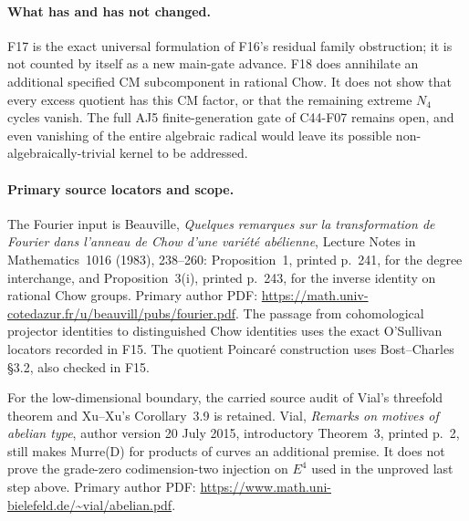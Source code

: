 \documentclass[11pt]{article}
\theoremstyle{remark}\newtheorem{remark}[theorem]{Remark}
\begin{document}
\paragraph{What has and has not changed.}
F17 is the exact universal formulation of F16's residual
family obstruction; it is not counted by itself as a new
main-gate advance.  F18 does annihilate an additional specified
CM subcomponent in rational Chow.  It does not show that
every excess quotient has this CM factor, or that the
remaining extreme $N_4$ cycles vanish.  The full AJ5
finite-generation gate of C44-F07 remains open, and even
vanishing of the entire algebraic radical would leave its
possible non-algebraically-trivial kernel to be addressed.

\paragraph{Primary source locators and scope.}
The Fourier input is Beauville, \emph{Quelques remarques sur
la transformation de Fourier dans l'anneau de Chow d'une
vari\'et\'e ab\'elienne}, Lecture Notes in Mathematics~1016
(1983), 238--260: Proposition~1, printed p.~241, for the
degree interchange, and Proposition~3(i), printed p.~243,
for the inverse identity on rational Chow groups.
Primary author PDF:
\url{https://math.univ-cotedazur.fr/u/beauvill/pubs/fourier.pdf}.
The passage from cohomological projector identities to
distinguished Chow identities uses the exact O'Sullivan
locators recorded in F15.  The quotient Poincar\'e construction
uses Bost--Charles \S3.2, also checked in F15.

For the low-dimensional boundary, the carried source audit
of Vial's threefold theorem and Xu--Xu's Corollary~3.9 is
retained.  Vial, \emph{Remarks on motives of abelian type},
author version 20 July 2015, introductory Theorem~3,
printed p.~2, still makes Murre(D) for products of curves
an additional premise.  It does not prove the grade-zero
codimension-two injection on $E^4$ used in the unproved
last step above.
Primary author PDF:
\url{https://www.math.uni-bielefeld.de/~vial/abelian.pdf}.


\end{document}
